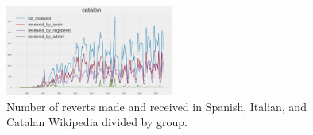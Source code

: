 \begin{figure}[H]
    \includegraphics[width=0.49\textwidth]{./chapters/04/assets/revert_received_ca.png}
    \caption{Number of reverts made and received in Spanish, Italian, and Catalan Wikipedia divided by group.}
    \label{fig:revuser}
\end{figure}










